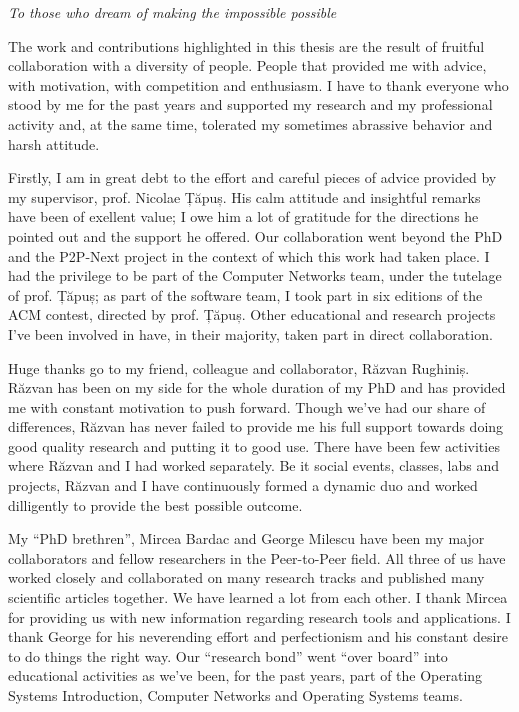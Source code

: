 \vspace*{7cm}
\begin{center}
\textit{To those who dream of making the impossible possible}
\end{center}

\newpage

The work and contributions highlighted in this thesis are the result of
fruitful collaboration with a diversity of people. People that provided me
with advice, with motivation, with competition and enthusiasm. I have to thank
everyone who stood by me for the past years and supported my research and my
professional activity and, at the same time, tolerated my sometimes abrassive
behavior and harsh attitude.

Firstly, I am in great debt to the effort and careful pieces of advice
provided by my supervisor, prof. Nicolae Țăpuș. His calm attitude and
insightful remarks have been of exellent value; I owe him a lot of gratitude
for the directions he pointed out and the support he offered. Our
collaboration went beyond the PhD and the P2P-Next project in the context of
which this work had taken place. I had the privilege to be part of the
Computer Networks team, under the tutelage of prof. Țăpuș; as part of the
software team, I took part in six editions of the ACM contest, directed by
prof. Țăpuș. Other educational and research projects I've been involved in
have, in their majority, taken part in direct collaboration.

Huge thanks go to my friend, colleague and collaborator, Răzvan Rughiniș.
Răzvan has been on my side for the whole duration of my PhD and has provided
me with constant motivation to push forward. Though we've had our share of
differences, Răzvan has never failed to provide me his full support towards
doing good quality research and putting it to good use. There have been few
activities where Răzvan and I had worked separately. Be it social events,
classes, labs and projects, Răzvan and I have continuously formed a dynamic
duo and worked dilligently to provide the best possible outcome.

My ``PhD brethren'', Mircea Bardac and George Milescu have been my major
collaborators and fellow researchers in the Peer-to-Peer field. All three of
us have worked closely and collaborated on many research tracks and published
many scientific articles together. We have learned a lot from each other. I
thank Mircea for providing us with new information regarding research tools
and applications. I thank George for his neverending effort and perfectionism
and his constant desire to do things the right way. Our ``research bond'' went
``over board'' into educational activities as we've been, for the past
years, part of the Operating Systems Introduction, Computer Networks and
Operating Systems teams.


